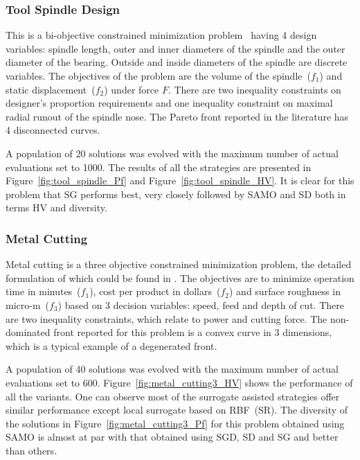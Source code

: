 \subsubsection{Tool Spindle Design}
This is a bi-objective constrained minimization problem~\cite{Tan2001ec} having 4 design variables: spindle length, outer and inner diameters of the spindle and the outer diameter of the bearing. Outside and inside diameters of the spindle are discrete variables. The objectives of the problem are the volume of the spindle~($f_1$) and static displacement~($f_2$) under force $F$. There are two inequality constraints on designer's proportion requirements and one inequality constraint on maximal radial runout of the spindle nose. The Pareto front reported in the literature has 4 disconnected curves. 

A population of 20 solutions was evolved with the maximum number of actual evaluations set to 1000. The results of all the strategies are presented in Figure~\ref{fig:tool_spindle_Pf} and Figure~\ref{fig:tool_spindle_HV}. It is clear for this problem that SG performs best, very closely followed by SAMO and SD both in terms HV and diversity. 

\subsubsection{Metal Cutting}
Metal cutting is a three objective constrained minimization problem, the detailed formulation of which could be found in \cite{Deb2012hybrid}. The objectives are to minimize operation time in minutes~($f_1$), cost per product in dollars~($f_2$) and surface roughness in micro-m~($f_3$) based on 3 decision variables: speed, feed and depth of cut. There are two inequality constraints, which relate to power and cutting force. The non-dominated front reported for this problem is a convex curve in 3 dimensions, which is a typical example of a degenerated front. 

A population of 40 solutions was evolved with the maximum number of actual evaluations set to 600. Figure~\ref{fig:metal_cutting3_HV} shows the performance of all the variants. One can observe most of the surrogate assisted strategies offer similar performance except local surrogate based on RBF~(SR). The diversity of the solutions in Figure~\ref{fig:metal_cutting3_Pf} for this problem obtained using SAMO is almost at par with that obtained using SGD, SD and SG and better than others.

